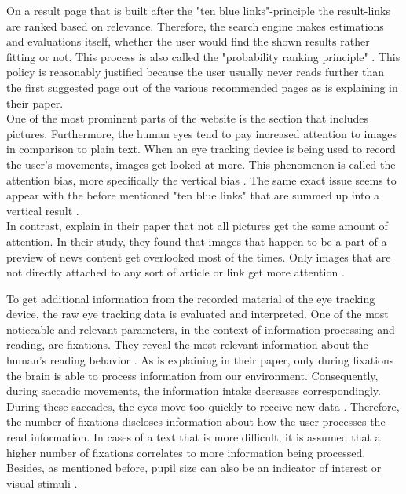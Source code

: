 On a result page that is built after the "ten blue links"-principle the result-links are ranked based on relevance. Therefore, the search engine makes estimations and evaluations itself, whether the user would find the shown results rather fitting or not. This process is also called the "probability ranking principle" \autocite{wang2016beyond}. This policy is reasonably justified because the user usually never reads further than the first suggested page out of the various recommended pages as \textcite{lewandowski2015evaluating} is explaining in their paper.\\
One of the most prominent parts of the website is the section that includes pictures. Furthermore, the human eyes tend to pay increased attention to images in comparison to plain text. When an eye tracking device is being used to record the user's movements,  images get looked at more. This phenomenon is called the attention bias, more specifically the vertical bias \autocite{wang2016beyond}.
The same exact issue seems to appear with the before mentioned "ten blue links" that are summed up into a vertical result \autocite{wang2016beyond}.\\
In contrast, \textcite{liu2015influence} explain in their paper that not all pictures get the same amount of attention. In their study, they found that images that happen to be a part of a preview of news content get overlooked most of the times. Only images that are not directly attached to any sort of article or link get more attention \autocite{liu2015influence}.

To get additional information from the recorded material of the eye tracking device, the raw eye tracking data is evaluated and interpreted. One of the most noticeable and relevant parameters, in the context of information processing and reading, are fixations. They reveal the most relevant information about the human's reading behavior \autocite{pan2007google}. As \textcite{rayner1998eye} is explaining in their paper, only during fixations the brain is able to process information from our environment. Consequently, during saccadic movements, the information intake decreases correspondingly. During these saccades, the eyes move too quickly to receive new data \autocite{rayner1998eye}. 
Therefore, the number of fixations discloses information about how the user processes the read information. In cases of a text that is more difficult, it is assumed that a higher number of fixations correlates to more information being processed. Besides, as mentioned before, pupil size can also be an indicator of interest or visual stimuli \autocite{pan2007google}.

